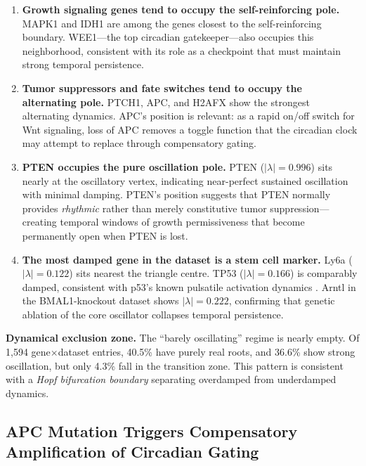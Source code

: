 \documentclass[11pt,a4paper]{article}
\begin{document}
\begin{enumerate}[noitemsep]
    \item \textbf{Growth signaling genes tend to occupy the self-reinforcing pole.} MAPK1 and IDH1 are among the genes closest to the self-reinforcing boundary. WEE1---the top circadian gatekeeper---also occupies this neighborhood, consistent with its role as a checkpoint that must maintain strong temporal persistence.

    \item \textbf{Tumor suppressors and fate switches tend to occupy the alternating pole.} PTCH1, APC, and H2AFX show the strongest alternating dynamics. APC's position is relevant: as a rapid on/off switch for Wnt signaling, loss of APC removes a toggle function that the circadian clock may attempt to replace through compensatory gating.

    \item \textbf{PTEN occupies the pure oscillation pole.} PTEN ($|\lambda| = 0.996$) sits nearly at the oscillatory vertex, indicating near-perfect sustained oscillation with minimal damping. PTEN's position suggests that PTEN normally provides \textit{rhythmic} rather than merely constitutive tumor suppression---creating temporal windows of growth permissiveness that become permanently open when PTEN is lost.

    \item \textbf{The most damped gene in the dataset is a stem cell marker.} Ly6a ($|\lambda| = 0.122$) sits nearest the triangle centre. TP53 ($|\lambda| = 0.166$) is comparably damped, consistent with p53's known pulsatile activation dynamics \citep{purvis2012}. Arntl in the BMAL1-knockout dataset shows $|\lambda| = 0.222$, confirming that genetic ablation of the core oscillator collapses temporal persistence.
\end{enumerate}

\textbf{Dynamical exclusion zone.} The ``barely oscillating'' regime is nearly empty. Of 1,594 gene$\times$dataset entries, 40.5\% have purely real roots, and 36.6\% show strong oscillation, but only 4.3\% fall in the transition zone. This pattern is consistent with a \textit{Hopf bifurcation boundary} separating overdamped from underdamped dynamics.

\subsection{APC Mutation Triggers Compensatory Amplification of Circadian Gating}
\end{document}
